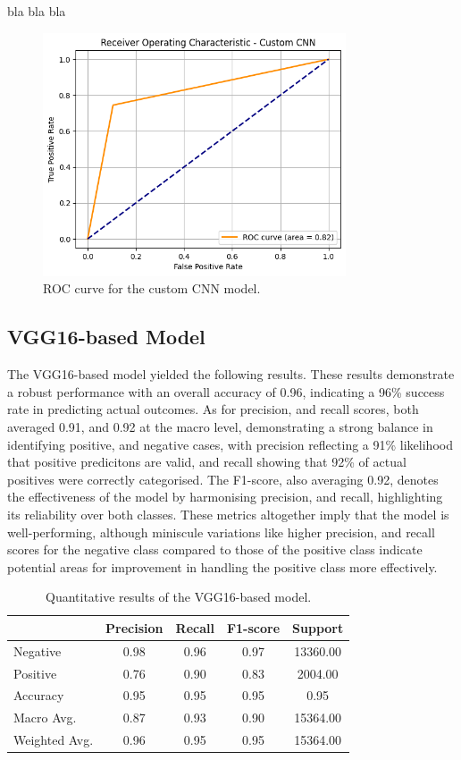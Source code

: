 \documentclass[../main]{subfiles}
\begin{document}
\noindent bla bla bla

\begin{figure}[h]
	\centering
	\includegraphics[width=0.8\textwidth]{assets/roc_custom_cnn.png}
	\caption{ROC curve for the custom CNN model.}
    \label{fig:roc-custom-cnn}
\end{figure}

\subsection{VGG16-based Model}
The VGG16-based model yielded the following results. These results demonstrate a robust performance with an overall accuracy of 0.96, indicating a 96\% success rate in predicting actual outcomes. As for precision, and recall scores, both averaged 0.91, and 0.92 at the macro level, demonstrating a strong balance in identifying positive, and negative cases, with precision reflecting a 91\% likelihood that positive predicitons are valid, and recall showing that 92\% of actual positives were correctly categorised. The F1-score, also averaging 0.92, denotes the effectiveness of the model by harmonising precision, and recall, highlighting its reliability over both classes. These metrics altogether imply that the model is well-performing, although miniscule variations like higher precision, and recall scores for the negative class compared to those of the positive class indicate potential areas for improvement in handling the positive class more effectively.

\begin{table}[h]
    \centering
    \begin{tabular}{|l|c|c|c|c|}
        \hline
         & Precision & Recall & F1-score & Support \\ \hline
        Negative & 0.98 & 0.96 & 0.97 & 13360.00 \\ \hline
        Positive & 0.76 & 0.90 & 0.83 & 2004.00 \\ \hline
        Accuracy & 0.95 & 0.95 & 0.95 & 0.95 \\ \hline
        Macro Avg. & 0.87 & 0.93 & 0.90 & 15364.00 \\ \hline
        Weighted Avg. & 0.96 & 0.95 & 0.95 & 15364.00 \\ \hline
    \end{tabular}
    \caption{Quantitative results of the VGG16-based model.}
    \label{tab:quantitative-results-vgg16}
\end{table}
\end{document}
